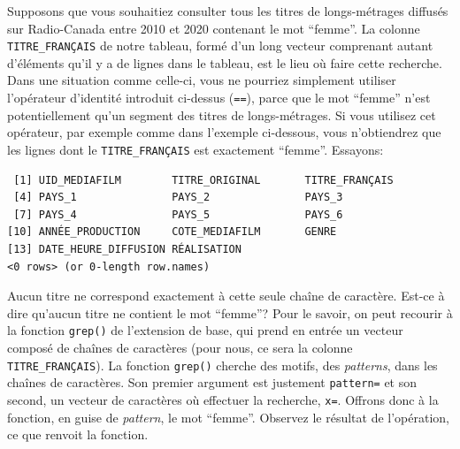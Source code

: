\documentclass[
  letterpaper,
  DIV=11,
  numbers=noendperiod]{scrartcl}
\newenvironment{Shaded}{\begin{snugshade}}{\end{snugshade}}
\newcommand{\AttributeTok}[1]{\textcolor[rgb]{0.40,0.45,0.13}{#1}}
\newcommand{\CommentTok}[1]{\textcolor[rgb]{0.37,0.37,0.37}{#1}}
\newcommand{\FunctionTok}[1]{\textcolor[rgb]{0.28,0.35,0.67}{#1}}
\newcommand{\NormalTok}[1]{\textcolor[rgb]{0.00,0.23,0.31}{#1}}
\newcommand{\SpecialCharTok}[1]{\textcolor[rgb]{0.37,0.37,0.37}{#1}}
\newcommand{\StringTok}[1]{\textcolor[rgb]{0.13,0.47,0.30}{#1}}
\begin{document}
Supposons que vous souhaitiez consulter tous les titres de
longs-métrages diffusés sur Radio-Canada entre 2010 et 2020 contenant le
mot ``femme''. La colonne \texttt{TITRE\_FRANÇAIS} de notre tableau,
formé d'un long vecteur comprenant autant d'éléments qu'il y a de lignes
dans le tableau, est le lieu où faire cette recherche. Dans une
situation comme celle-ci, vous ne pourriez simplement utiliser
l'opérateur d'identité introduit ci-dessus (\texttt{==}), parce que le
mot ``femme'' n'est potentiellement qu'un segment des titres de
longs-métrages. Si vous utilisez cet opérateur, par exemple comme dans
l'exemple ci-dessous, vous n'obtiendrez que les lignes dont le
\texttt{TITRE\_FRANÇAIS} est exactement ``femme''. Essayons:

\begin{Shaded}
\end{Shaded}

\begin{verbatim}
 [1] UID_MEDIAFILM        TITRE_ORIGINAL       TITRE_FRANÇAIS      
 [4] PAYS_1               PAYS_2               PAYS_3              
 [7] PAYS_4               PAYS_5               PAYS_6              
[10] ANNÉE_PRODUCTION     COTE_MEDIAFILM       GENRE               
[13] DATE_HEURE_DIFFUSION RÉALISATION         
<0 rows> (or 0-length row.names)
\end{verbatim}

Aucun titre ne correspond exactement à cette seule chaîne de caractère.
Est-ce à dire qu'aucun titre ne contient le mot ``femme''? Pour le
savoir, on peut recourir à la fonction \texttt{grep()} de l'extension de
base, qui prend en entrée un vecteur composé de chaînes de caractères
(pour nous, ce sera la colonne \texttt{TITRE\_FRANÇAIS}). La fonction
\texttt{grep()} cherche des motifs, des \emph{patterns}, dans les
chaînes de caractères. Son premier argument est justement
\texttt{pattern=} et son second, un vecteur de caractères où effectuer
la recherche, \texttt{x=}. Offrons donc à la fonction, en guise de
\emph{pattern}, le mot ``femme''. Observez le résultat de l'opération,
ce que renvoit la fonction.

\begin{Shaded}
\end{Shaded}
\end{document}
